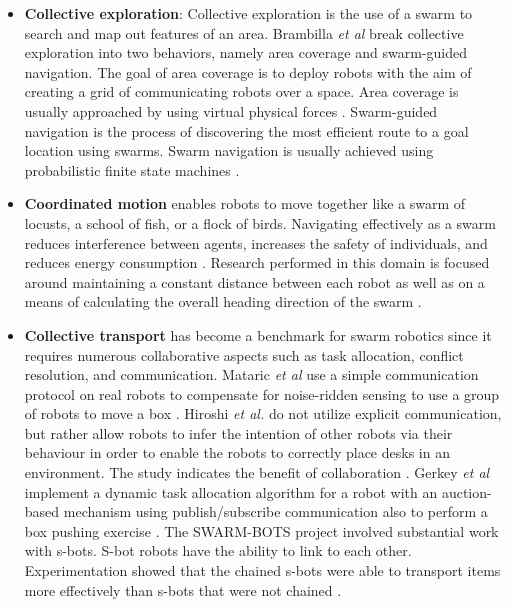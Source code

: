 \begin{itemize}
\item \textbf{Collective exploration}: Collective exploration is the use of a swarm to search and map out features of an area. Brambilla \textit{et al} \cite{brambilla2013swarm} break collective exploration into two behaviors, namely area coverage and swarm-guided navigation. The goal of area coverage is to deploy robots with the aim of creating a grid of communicating robots over a space. Area coverage is usually approached by using virtual physical forces \cite{howard2002mobile,stirling2010energy}.
Swarm-guided navigation is the process of discovering the most efficient route to a goal location using swarms. Swarm navigation is usually achieved using probabilistic finite state machines \cite{payton2001pheromone,ducatelle2011self}. 

\item \textbf{Coordinated motion} 
enables robots to move together like a swarm of locusts, a school of fish, or a flock of birds. Navigating effectively as a swarm reduces interference between agents, increases the safety of individuals, and reduces energy consumption \cite{parrish2002self}. Research performed in this domain is focused around maintaining a constant distance between each robot as well as on a means of calculating the overall heading direction of the swarm \cite{turgut2008self,ferrante2010flocking,baldassarre2003evolving}.

\item \textbf{Collective transport} has become a benchmark for swarm robotics since it requires numerous collaborative aspects such as task allocation, conflict resolution, and communication. Mataric \textit{et al} use a simple communication protocol on real robots to compensate for noise-ridden sensing to use a group of robots to move a box \cite{mataric1995cooperative}. Hiroshi \textit{et al.} do not utilize explicit communication, but rather allow robots to infer the intention of other robots via their behaviour in order to enable the robots to correctly place desks in an environment. The study indicates the benefit of collaboration \cite{sugie1995placing}. Gerkey \textit{et al} implement a dynamic task allocation algorithm for a robot with an auction-based mechanism using publish/subscribe communication also to perform a box pushing exercise \cite{gerkey2002sold}. The SWARM-BOTS project involved substantial work with s-bots. S-bot robots have the ability to link to each other. Experimentation showed that the chained s-bots were able to transport items more effectively than s-bots that were not chained \cite{gross2004group, dorigo2005swarm, ferrante2013socially}.

\end{itemize}
		
